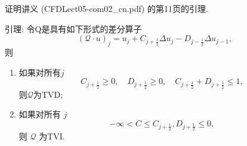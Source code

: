 \documentclass[12pt]{article}
\begin{document}
证明讲义 (CFDLect05-com02\_cn.pdf) 的第11页的引理.

引理: 令Q是具有如下形式的差分算子
\begin{equation}
	(\mathcal{Q} \cdot u)_{j}=u_{j}+C_{j+\frac{1}{2}} \Delta u_{j}-D_{j-\frac{1}{2}} \Delta u_{j-1},
	\label{eq:31}
\end{equation}
则
\begin{enumerate}
	\item 如果对所有$j$
	\begin{equation}
		C_{j+\frac{1}{2}} \geq 0, \quad D_{j+\frac{1}{2}} \geq 0, \quad C_{j+\frac{1}{2}}+D_{j+\frac{1}{2}} \leqslant 1,
	\end{equation}
	则$\mathcal{Q}$为TVD; 
	\item 如果对所有 $j$
	\begin{equation}
		-\infty<C \leqslant C_{j+\frac{1}{2}},  D_{j+\frac{1}{2}} \leqslant 0,
	\end{equation}	
	则 $\mathcal{Q}$ 为TVI.
\end{enumerate}
\end{document}
